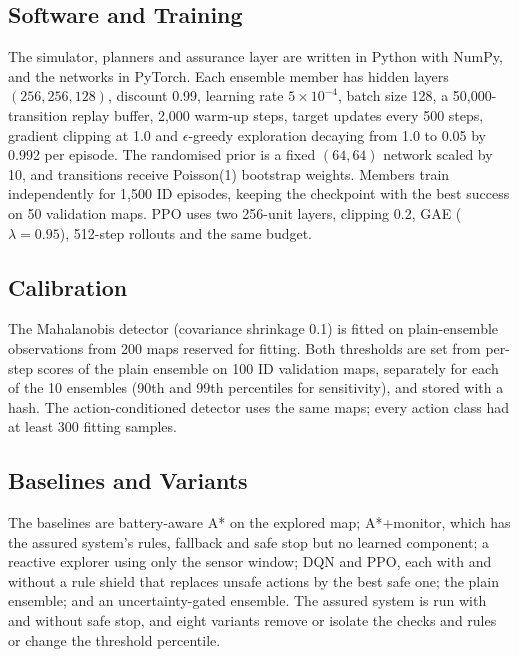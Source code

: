 \documentclass[conference]{IEEEtran}
\begin{document}
\subsection{Software and Training}
The simulator, planners and assurance layer are written in Python with NumPy, and the networks in PyTorch. Each ensemble
member has hidden layers $(256,256,128)$, discount 0.99, learning rate $5\times10^{-4}$, batch size 128, a 50{,}000-transition
replay buffer, 2{,}000 warm-up steps, target updates every 500 steps, gradient clipping at 1.0 and $\epsilon$-greedy
exploration decaying from 1.0 to 0.05 by 0.992 per episode. The randomised prior is a fixed $(64,64)$ network scaled by 10,
and transitions receive Poisson(1) bootstrap weights. Members train independently for 1{,}500 ID episodes, keeping the
checkpoint with the best success on 50 validation maps. PPO uses two 256-unit layers, clipping 0.2, GAE ($\lambda=0.95$), 512-step rollouts and the same budget.

\subsection{Calibration}
The Mahalanobis detector (covariance shrinkage 0.1) is fitted on plain-ensemble observations from 200 maps reserved for
fitting. Both thresholds are set from per-step scores of the plain ensemble on 100 ID validation maps, separately for each
of the 10 ensembles (90th and 99th percentiles for sensitivity), and stored with a hash. The action-conditioned detector
uses the same maps; every action class had at least 300 fitting samples.

\subsection{Baselines and Variants}
The baselines are battery-aware A* on the explored map; A*+monitor, which has the assured system's rules, fallback and
safe stop but no learned component; a reactive explorer using only the sensor window; DQN and PPO, each with and without a
rule shield that replaces unsafe actions by the best safe one; the plain ensemble; and an uncertainty-gated ensemble. The
assured system is run with and without safe stop, and eight variants remove or isolate the checks and rules or change the
threshold percentile.
\end{document}
